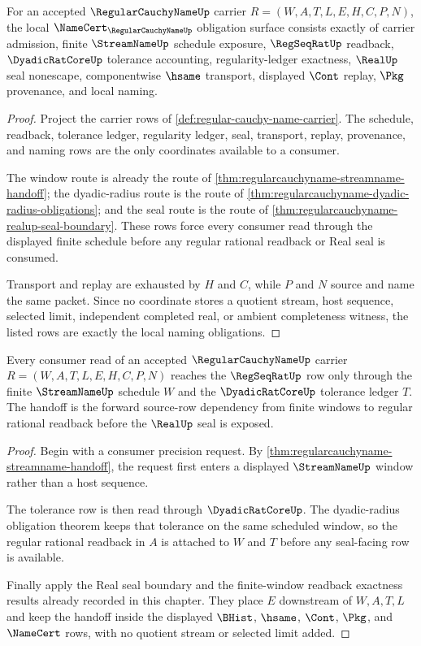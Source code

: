 \begin{theorem}
\label{thm:regular-cauchy-name-namecert-obligations}
For an accepted $\RegularCauchyNameUp$ carrier $R=(W,A,T,L,E,H,C,P,N)$, the local $\NameCert_{\RegularCauchyNameUp}$ obligation surface consists exactly of carrier admission, finite $\StreamNameUp$ schedule exposure, $\RegSeqRatUp$ readback, $\DyadicRatCoreUp$ tolerance accounting, regularity-ledger exactness, $\RealUp$ seal nonescape, componentwise $\hsame$ transport, displayed $\Cont$ replay, $\Pkg$ provenance, and local naming.
\end{theorem}
\begin{proof}
Project the carrier rows of \autoref{def:regular-cauchy-name-carrier}. The schedule, readback, tolerance ledger, regularity ledger, seal, transport, replay, provenance, and naming rows are the only coordinates available to a consumer.

The window route is already the route of \autoref{thm:regularcauchyname-streamname-handoff}; the dyadic-radius route is the route of \autoref{thm:regularcauchyname-dyadic-radius-obligations}; and the seal route is the route of \autoref{thm:regularcauchyname-realup-seal-boundary}. These rows force every consumer read through the displayed finite schedule before any regular rational readback or Real seal is consumed.

Transport and replay are exhausted by $H$ and $C$, while $P$ and $N$ source and name the same packet. Since no coordinate stores a quotient stream, host sequence, selected limit, independent completed real, or ambient completeness witness, the listed rows are exactly the local naming obligations.
\end{proof}

\begin{theorem}
\label{thm:regular-cauchy-name-streamname-regseqrat-handoff}
Every consumer read of an accepted $\RegularCauchyNameUp$ carrier $R=(W,A,T,L,E,H,C,P,N)$ reaches the $\RegSeqRatUp$ row only through the finite $\StreamNameUp$ schedule $W$ and the $\DyadicRatCoreUp$ tolerance ledger $T$. The handoff is the forward source-row dependency from finite windows to regular rational readback before the $\RealUp$ seal is exposed.
\end{theorem}
\begin{proof}
Begin with a consumer precision request. By \autoref{thm:regularcauchyname-streamname-handoff}, the request first enters a displayed $\StreamNameUp$ window rather than a host sequence.

The tolerance row is then read through $\DyadicRatCoreUp$. The dyadic-radius obligation theorem keeps that tolerance on the same scheduled window, so the regular rational readback in $A$ is attached to $W$ and $T$ before any seal-facing row is available.

Finally apply the Real seal boundary and the finite-window readback exactness results already recorded in this chapter. They place $E$ downstream of $W,A,T,L$ and keep the handoff inside the displayed $\BHist$, $\hsame$, $\Cont$, $\Pkg$, and $\NameCert$ rows, with no quotient stream or selected limit added.
\end{proof}

